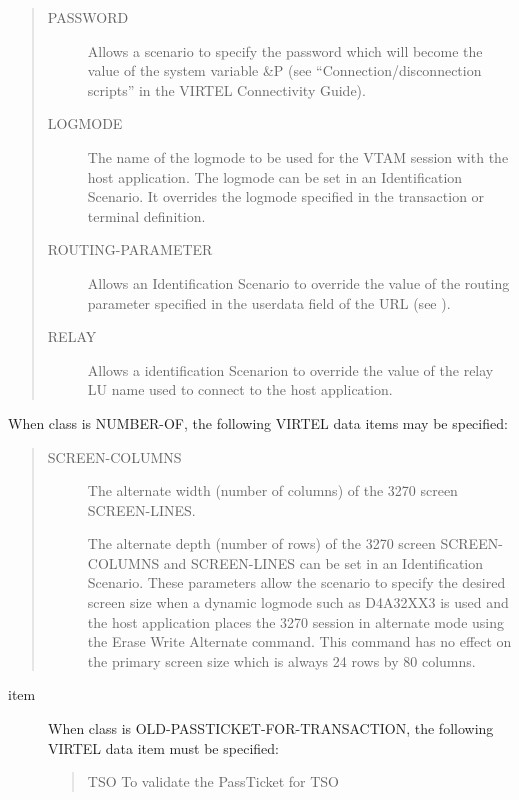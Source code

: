 \documentclass[letterpaper,10pt,english]{sphinxmanual}
\begin{document}
\begin{description}
\begin{quote}
\begin{description}
\item[{PASSWORD}] \leavevmode
Allows a scenario to specify the password which will become the value of the system variable \&P (see “Connection/disconnection scripts” in the VIRTEL Connectivity Guide).

\item[{LOGMODE}] \leavevmode
The name of the logmode to be used for the VTAM session with the host application. The logmode can be set in an Identification Scenario. It overrides the logmode specified in the transaction or terminal definition.

\item[{ROUTING-PARAMETER}] \leavevmode
Allows an Identification Scenario to override the value of the routing parameter specified in the userdata field of the URL (see {\hyperref[\detokenize{User_Guide:v457ug-url-formats}]{}}).

\item[{RELAY}] \leavevmode
Allows a identification Scenarion to override the value of the relay LU name used to connect to the host application.

\end{description}
\end{quote}

\end{description}

When class is NUMBER-OF, the following VIRTEL data items may be specified:
\begin{quote}
\begin{description}
\item[{SCREEN-COLUMNS}] \leavevmode
The alternate width (number of columns) of the 3270 screen SCREEN-LINES.

The alternate depth (number of rows) of the 3270 screen SCREEN-COLUMNS and SCREEN-LINES can be set in an Identification Scenario. These parameters allow the scenario to specify the desired screen size when a dynamic logmode such as D4A32XX3 is used and the host application places the 3270 session in alternate mode using the Erase Write Alternate command. This command has no effect on the primary screen size which is always 24 rows by 80 columns.

\end{description}
\end{quote}
\begin{description}
\item[{item}] \leavevmode
When class is OLD-PASSTICKET-FOR-TRANSACTION, the following VIRTEL data item must be specified:
\begin{quote}

TSO
To validate the PassTicket for TSO
\end{quote}

\end{description}
\end{document}
